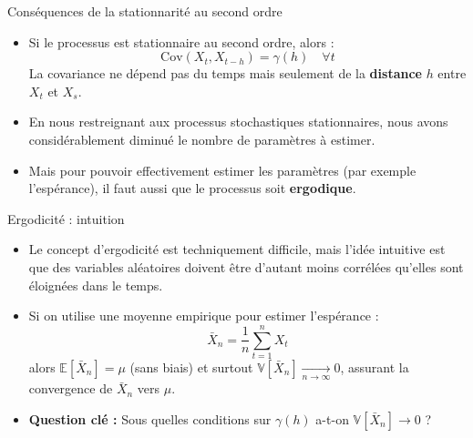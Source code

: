 \documentclass[11pt,aspectratio=169]{beamer}
\newcommand{\E}{\mathbb{E}}
\newcommand{\Var}{\mathbb{V}}
\newcommand{\Cov}{\mathrm{Cov}}
\begin{document}
\begin{frame}{Conséquences de la stationnarité au second ordre}

\begin{itemize}

\item Si le processus est stationnaire au second ordre, alors :
  \[
  \Cov(X_t, X_{t-h}) = \gamma(h) \quad \forall t
  \]
  La covariance ne dépend pas du temps mais seulement de la \textbf{distance} $h$ entre $X_t$ et $X_s$.\newline

\item En nous restreignant aux processus stochastiques stationnaires, nous avons considérablement diminué le nombre de paramètres à estimer.\newline

\item Mais pour pouvoir effectivement estimer les paramètres (par exemple l'espérance), il faut aussi que le processus soit \textbf{ergodique}.

\end{itemize}

\end{frame}

\begin{frame}{Ergodicité : intuition}

\begin{itemize}

\item Le concept d'ergodicité est techniquement difficile, mais l'idée intuitive est que des variables aléatoires doivent être d'autant moins corrélées qu'elles sont éloignées dans le temps.\newline

\item Si on utilise une moyenne empirique pour estimer l'espérance :
  \[
  \bar{X}_n = \frac{1}{n} \sum_{t=1}^{n} X_t
  \]
  alors $\E[\bar{X}_n] = \mu$ (sans biais) et surtout $\Var[\bar{X}_n] \xrightarrow[n \to \infty]{} 0$, assurant la convergence de $\bar{X}_n$ vers $\mu$.\newline

\item \textbf{Question clé :} Sous quelles conditions sur $\gamma(h)$ a-t-on $\Var[\bar{X}_n] \to 0$ ?

\end{itemize}

\end{frame}
\end{document}

